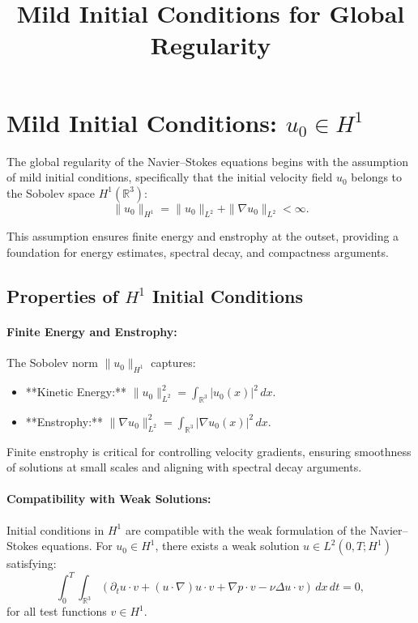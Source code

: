 \documentclass[12pt]{article}
\theoremstyle{definition}
\begin{document}
\title{Mild Initial Conditions for Global Regularity}
\author{}
\date{}
\maketitle

\section{Mild Initial Conditions: $u_0 \in H^1$}

The global regularity of the Navier--Stokes equations begins with the assumption of mild initial conditions, specifically that the initial velocity field $u_0$ belongs to the Sobolev space $H^1(\mathbb{R}^3)$:
\begin{equation}
\|u_0\|_{H^1} = \|u_0\|_{L^2} + \|\nabla u_0\|_{L^2} < \infty.
\end{equation}

This assumption ensures finite energy and enstrophy at the outset, providing a foundation for energy estimates, spectral decay, and compactness arguments.

\subsection{Properties of $H^1$ Initial Conditions}

\paragraph{Finite Energy and Enstrophy:}
The Sobolev norm $\|u_0\|_{H^1}$ captures:
\begin{itemize}
    \item **Kinetic Energy:** $\|u_0\|_{L^2}^2 = \int_{\mathbb{R}^3} |u_0(x)|^2 \, dx$.
    \item **Enstrophy:** $\|\nabla u_0\|_{L^2}^2 = \int_{\mathbb{R}^3} |\nabla u_0(x)|^2 \, dx$.
\end{itemize}
Finite enstrophy is critical for controlling velocity gradients, ensuring smoothness of solutions at small scales and aligning with spectral decay arguments.

\paragraph{Compatibility with Weak Solutions:}
Initial conditions in $H^1$ are compatible with the weak formulation of the Navier--Stokes equations. For $u_0 \in H^1$, there exists a weak solution $u \in L^2(0, T; H^1)$ satisfying:
\begin{equation}
\int_0^T \int_{\mathbb{R}^3} \left( \partial_t u \cdot v + (u \cdot \nabla) u \cdot v + \nabla p \cdot v - \nu \Delta u \cdot v \right) \, dx \, dt = 0,
\end{equation}
for all test functions $v \in H^1$.
\end{document}
